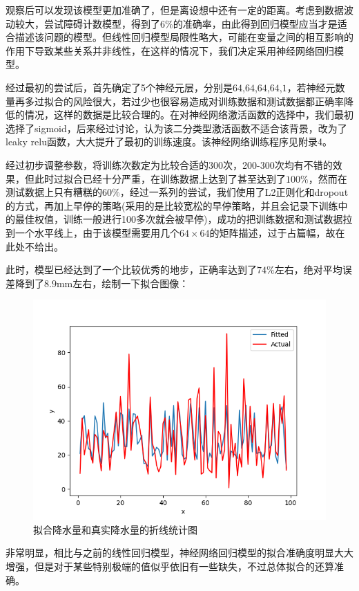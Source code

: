 \documentclass[UTF8, a4paper]{ctexart}
\begin{document}
观察后可以发现该模型更加准确了，但是离设想中还有一定的距离。考虑到数据波动较大，尝试障碍计数模型，得到了$6\%$的准确率，由此得到回归模型应当才是适合描述该问题的模型。但线性回归模型局限性略大，可能在变量之间的相互影响的作用下导致某些关系并非线性，在这样的情况下，我们决定采用神经网络回归模型。

经过最初的尝试后，首先确定了5个神经元层，分别是$64$,$64$,$64$,$64$,$1$，若神经元数量再多过拟合的风险很大，若过少也很容易造成对训练数据和测试数据都正确率降低的情况，这样的数据是比较合理的。在对神经网络激活函数的选择中，我们最初选择了sigmoid，后来经过讨论，认为该二分类型激活函数不适合该背景，改为了leaky relu函数，大大提升了最初的训练速度。该神经网络训练程序见附录4。

经过初步调整参数，将训练次数定为比较合适的300次，200-300次均有不错的效果，但此时过拟合已经十分严重，在训练数据上达到了甚至达到了$100\%$，然而在测试数据上只有糟糕的$60\%$，经过一系列的尝试，我们使用了L2正则化和dropout的方式，再加上早停的策略(采用的是比较宽松的早停策略，并且会记录下训练中的最佳权值，训练一般进行100多次就会被早停)，成功的把训练数据和测试数据拉到一个水平线上，由于该模型需要用几个$64\times64$的矩阵描述，过于占篇幅，故在此处不给出。

此时，模型已经达到了一个比较优秀的地步，正确率达到了$74\%$左右，绝对平均误差降到了$8.9$mm左右，绘制一下拟合图像：

\begin{figure}[h!]
	\centering
	\includegraphics[scale=0.5]{fit3.png}
	\caption{拟合降水量和真实降水量的折线统计图}
\end{figure}

非常明显，相比与之前的线性回归模型，神经网络回归模型的拟合准确度明显大大增强，但是对于某些特别极端的值似乎依旧有一些缺失，不过总体拟合的还算准确。
\end{document}
